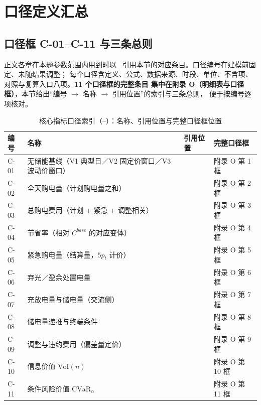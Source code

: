 \section{口径定义汇总}

\subsection{口径框 C-01--C-11 与三条总则}\label{sec:caliber-app}

正文各章在本题参数范围内用到时以~ 引用本节的对应条目。口径编号在建模前固定、未随结果调整；
每个口径含定义、公式、数据来源、时段、单位、不含项、对照与复算入口八项。\textbf{11 个口径框的完整条目
集中在附录 O（明细表与口径框）}，本节给出“编号 \(\to\) 名称 \(\to\) 引用位置”的索引与三条总则，
便于按编号逐项核对。

\begin{table}[htbp]
  \centering
  \caption{核心指标口径索引（--）：名称、引用位置与完整口径框位置}
  \label{tab:caliber-index}
  \footnotesize
  \setlength{\tabcolsep}{4pt}
  \begin{tabularx}{\linewidth}{C{1.05cm} L{5.6cm} C{2.0cm} Y}
    \toprule
    编号 & 名称 & 引用位置 & 完整口径框 \\
    \midrule
    C-01 & 无储能基线（V1 典型日／V2 固定价窗口／V3 波动价窗口） &  & 附录 O 第 1 框 \\
    C-02 & 全天购电量（计划购电量之和） &  & 附录 O 第 2 框 \\
    C-03 & 总购电费用（计划 \(+\) 紧急 \(+\) 调整相关） &  & 附录 O 第 3 框 \\
    C-04 & 节省率（相对 \(C^{base}\) 的对应变体） &  & 附录 O 第 4 框 \\
    C-05 & 紧急购电量（结算量，\(5p_t\) 计价） &  & 附录 O 第 5 框 \\
    C-06 & 弃光／盈余处置电量 &  & 附录 O 第 6 框 \\
    C-07 & 充放电量与储电量（交流侧） &  & 附录 O 第 7 框 \\
    C-08 & 储电量递推与终端条件 &  & 附录 O 第 8 框 \\
    C-09 & 调整与违约费用（偏差量定价） &  & 附录 O 第 9 框 \\
    C-10 & 信息价值 \(\mathrm{VoI}(n)\) &  & 附录 O 第 10 框 \\
    C-11 & 条件风险价值 \(\mathrm{CVaR}_\alpha\) &  & 附录 O 第 11 框 \\
    \bottomrule
  \end{tabularx}
\end{table}


